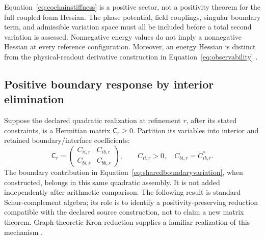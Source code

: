 \documentclass[11pt,letterpaper]{article}
\numberwithin{equation}{section}
\theoremstyle{definition}
\theoremstyle{remark}
\newcommand{\C}{\mathbb C}
\begin{document}
Equation~\eqref{eq:cochainstiffness} is a positive sector, not a positivity theorem for the full coupled foam Hessian. The phase potential, field couplings, singular boundary term, and admissible variation space must all be included before a total second variation is assessed. Nonnegative energy values do not imply a nonnegative Hessian at every reference configuration. Moreover, an energy Hessian is distinct from the physical-readout derivative construction in Equation~\eqref{eq:observability} \cite{tcgsfoam,tcgsoperator}.

\subsection{Positive boundary response by interior elimination}
\label{subsec:schur}
Suppose the declared quadratic realization at refinement $r$, after its stated constraints, is a Hermitian matrix $\mathsf C_r\geq0$. Partition its variables into interior and retained boundary/interface coefficients:
\begin{equation}
 \mathsf C_r=
 \begin{pmatrix}C_{ii,r}&C_{ib,r}\\C_{bi,r}&C_{bb,r}\end{pmatrix},
 \qquad C_{ii,r}>0,\quad C_{bi,r}=C_{ib,r}^{*}.
 \label{eq:sourceblock}
\end{equation}
The boundary contribution in Equation~\eqref{eq:sharedboundaryvariation}, when constructed, belongs in this same quadratic assembly. It is not added independently after arithmetic comparison. The following result is standard Schur-complement algebra; its role is to identify a positivity-preserving reduction compatible with the declared source construction, not to claim a new matrix theorem. Graph-theoretic Kron reduction supplies a familiar realization of this mechanism \cite{kron}.
\end{document}
